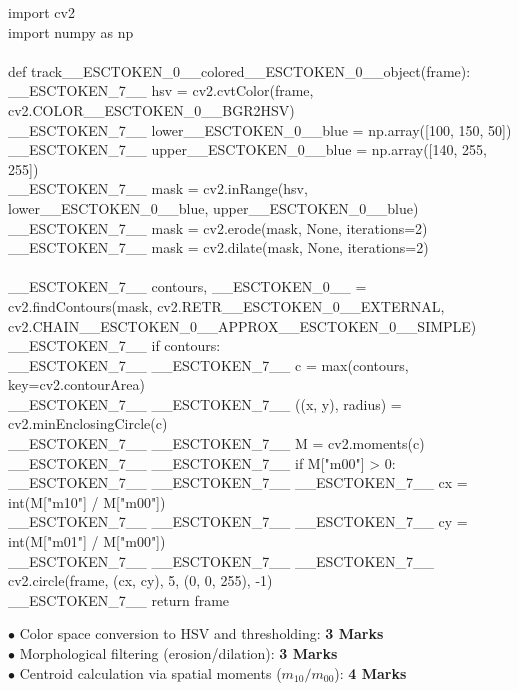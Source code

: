 \begin{solutionbox}
\begin{pycode}
import cv2\\
import numpy as np\\
~\\
def track\_\_ESCTOKEN\_0\_\_colored\_\_ESCTOKEN\_0\_\_object(frame):\\
\_\_ESCTOKEN\_7\_\_ hsv = cv2.cvtColor(frame, cv2.COLOR\_\_ESCTOKEN\_0\_\_BGR2HSV)\\
\_\_ESCTOKEN\_7\_\_ lower\_\_ESCTOKEN\_0\_\_blue = np.array([100, 150, 50])\\
\_\_ESCTOKEN\_7\_\_ upper\_\_ESCTOKEN\_0\_\_blue = np.array([140, 255, 255])\\
\_\_ESCTOKEN\_7\_\_ mask = cv2.inRange(hsv, lower\_\_ESCTOKEN\_0\_\_blue, upper\_\_ESCTOKEN\_0\_\_blue)\\
\_\_ESCTOKEN\_7\_\_ mask = cv2.erode(mask, None, iterations=2)\\
\_\_ESCTOKEN\_7\_\_ mask = cv2.dilate(mask, None, iterations=2)\\
~\\
\_\_ESCTOKEN\_7\_\_ contours, \_\_ESCTOKEN\_0\_\_ = cv2.findContours(mask, cv2.RETR\_\_ESCTOKEN\_0\_\_EXTERNAL, cv2.CHAIN\_\_ESCTOKEN\_0\_\_APPROX\_\_ESCTOKEN\_0\_\_SIMPLE)\\
\_\_ESCTOKEN\_7\_\_ if contours:\\
\_\_ESCTOKEN\_7\_\_ \_\_ESCTOKEN\_7\_\_ c = max(contours, key=cv2.contourArea)\\
\_\_ESCTOKEN\_7\_\_ \_\_ESCTOKEN\_7\_\_ ((x, y), radius) = cv2.minEnclosingCircle(c)\\
\_\_ESCTOKEN\_7\_\_ \_\_ESCTOKEN\_7\_\_ M = cv2.moments(c)\\
\_\_ESCTOKEN\_7\_\_ \_\_ESCTOKEN\_7\_\_ if M["m00"] > 0:\\
\_\_ESCTOKEN\_7\_\_ \_\_ESCTOKEN\_7\_\_ \_\_ESCTOKEN\_7\_\_ cx = int(M["m10"] / M["m00"])\\
\_\_ESCTOKEN\_7\_\_ \_\_ESCTOKEN\_7\_\_ \_\_ESCTOKEN\_7\_\_ cy = int(M["m01"] / M["m00"])\\
\_\_ESCTOKEN\_7\_\_ \_\_ESCTOKEN\_7\_\_ \_\_ESCTOKEN\_7\_\_ cv2.circle(frame, (cx, cy), 5, (0, 0, 255), -1)\\
\_\_ESCTOKEN\_7\_\_ return frame
\end{pycode}
\begin{markingrubric}
$\bullet$ Color space conversion to HSV and thresholding: \textbf{3 Marks}\\$\bullet$ Morphological filtering (erosion/dilation): \textbf{3 Marks}\\$\bullet$ Centroid calculation via spatial moments ($m_{10}/m_{00}$): \textbf{4 Marks}
\end{markingrubric}
\end{solutionbox}

